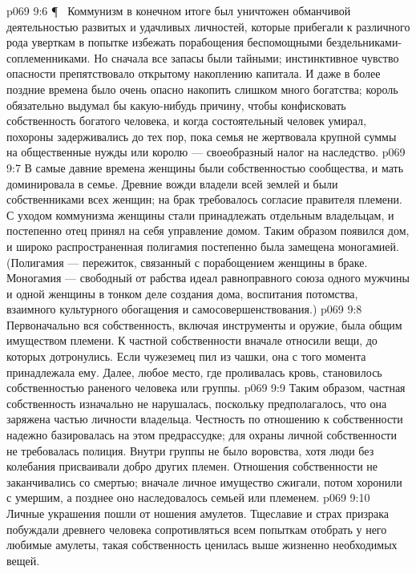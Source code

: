\vs p069 9:6 \P\ \bibnobreakspace {} Коммунизм в конечном итоге был уничтожен обманчивой деятельностью развитых и удачливых личностей, которые прибегали к различного рода уверткам в попытке избежать порабощения беспомощными бездельниками\hyp{}соплеменниками. Но сначала все запасы были тайными; инстинктивное чувство опасности препятствовало открытому накоплению капитала. И даже в более поздние времена было очень опасно накопить слишком много богатства; король обязательно выдумал бы какую\hyp{}нибудь причину, чтобы конфисковать собственность богатого человека, и когда состоятельный человек умирал, похороны задерживались до тех пор, пока семья не жертвовала крупной суммы на общественные нужды или королю --- своеобразный налог на наследство.
\vs p069 9:7 В самые давние времена женщины были собственностью сообщества, и мать доминировала в семье. Древние вожди владели всей землей и были собственниками всех женщин; на брак требовалось согласие правителя племени. С уходом коммунизма женщины стали принадлежать отдельным владельцам, и постепенно отец принял на себя управление домом. Таким образом появился дом, и широко распространенная полигамия постепенно была замещена моногамией. (Полигамия --- пережиток, связанный с порабощением женщины в браке. Моногамия --- свободный от рабства идеал равноправного союза одного мужчины и одной женщины в тонком деле создания дома, воспитания потомства, взаимного культурного обогащения и самосовершенствования.)
\vs p069 9:8 Первоначально вся собственность, включая инструменты и оружие, была общим имуществом племени. К частной собственности вначале относили вещи, до которых дотронулись. Если чужеземец пил из чашки, она с того момента принадлежала ему. Далее, любое место, где проливалась кровь, становилось собственностью раненого человека или группы.
\vs p069 9:9 Таким образом, частная собственность изначально не нарушалась, поскольку предполагалось, что она заряжена частью личности владельца. Честность по отношению к собственности надежно базировалась на этом предрассудке; для охраны личной собственности не требовалась полиция. Внутри группы не было воровства, хотя люди без колебания присваивали добро других племен. Отношения собственности не заканчивались со смертью; вначале личное имущество сжигали, потом хоронили с умершим, а позднее оно наследовалось семьей или племенем.
\vs p069 9:10 Личные украшения пошли от ношения амулетов. Тщеславие и страх призрака побуждали древнего человека сопротивляться всем попыткам отобрать у него любимые амулеты, такая собственность ценилась выше жизненно необходимых вещей.

